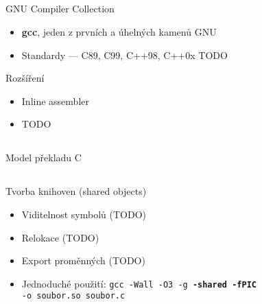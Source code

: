 \documentclass{beamer}
\begin{document}
\subsection{}
\begin{frame}{GNU Compiler Collection}
\begin{itemize}
\item {\bf gcc}, jeden z prvních a úhelných kamenů GNU
\item Standardy --- C89, C99, C++98, C++0x TODO
\end{itemize}
\begin{block}{Rozšíření}
\begin{itemize}
\item Inline assembler
\item TODO
\end{itemize}
\end{block}
\end{frame}

\subsection{}
\begin{frame}{Model překladu C}
\end{frame}

\subsection{}
\begin{frame}{Tvorba knihoven (shared objects)}
\begin{itemize}
\item Viditelnost symbolů (TODO)
\item Relokace (TODO)
\item Export proměnných (TODO)
\item Jednoduché použití: {\tt gcc -Wall -O3 -g {\bf -shared -fPIC} \\ -o soubor.so soubor.c}
\end{itemize}
\end{frame}
\end{document}
